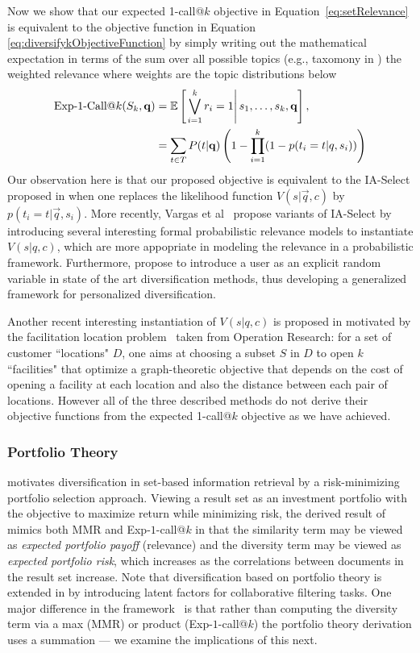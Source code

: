 Now we show that our expected 1-call@$k$ objective in Equation~\eqref{eq:setRelevance} is equivalent to the objective function in Equation \eqref{eq:diversifykObjectiveFunction} by simply writing out the mathematical expectation in terms of the sum over all possible topics (e.g., taxomony in \cite{agrawal09diversifying}) the weighted relevance where weights are the topic distributions below
\begin{align*}
    \ExpOneCall(S_k,\vec{q}) & = \mathbb{E} \left[\left. \bigvee_{i=1}^{k}r_i=1 \right| s_{1},\dots, s_{k},\vec{q} \right], \\
    												 & = \sum_{t\in T} P(t|\vec{q}) \left( 1 - \prod_{i=1}^{k}(1-p(t_i = t| q, s_i))\right) 
\end{align*}
Our observation here is that our proposed objective is equivalent to the IA-Select proposed in \cite{agrawal09diversifying} when one replaces the likelihood function $V(s|\vec{q}, c)$ by $p(t_i = t| \vec{q}, s_i)$. More recently, Vargas et al~\cite{Vargas:SIGIR2012} propose variants of IA-Select by introducing several interesting formal probabilistic relevance models to instantiate $V(s| q, c)$, which are more appopriate in modeling the relevance in a probabilistic framework. Furthermore, \cite{Vallet:SIGIR2012} propose to introduce a user as an explicit random variable in state of the art diversification methods, thus developing a generalized framework for personalized diversification.

Another recent interesting instantiation of $V(s|q,c)$ is proposed in \cite{Zuccon:ECIR2012} motivated by the facilitation location problem~\cite{Gonzalez:Handbook2007} taken from Operation Research: for a set of customer ``locations" $D$, one aims at choosing a subset $S$ in $D$ to open $k$ ``facilities" that optimize a graph-theoretic objective that depends on the cost of opening a facility at each location and also the distance between each pair of locations. However all of the three described methods do not derive their objective functions from the expected 1-call@$k$ objective as we have achieved. 

\subsubsection{Portfolio Theory}
\cite{wang09PortfolioTheory} motivates
diversification in set-based information retrieval by a
risk-minimizing portfolio selection approach.  Viewing a result set as
an investment portfolio with the objective to maximize return while
minimizing risk, the derived result of~\cite{wang09PortfolioTheory}
mimics both MMR and Exp-$1$-call@$k$ in that the similarity term may
be viewed as \emph{expected portfolio payoff} (relevance) and the
diversity term may be viewed as \emph{expected portfolio risk}, which
increases as the correlations between documents in the result set
increase. Note that diversification based on portfolio theory is extended in \cite{Shi:SIGIR2012} by introducing latent factors for collaborative filtering tasks. One major difference in the framework~\cite{wang09PortfolioTheory} is that rather than
computing the diversity term via a max (MMR) or product
(Exp-$1$-call@$k$) the portfolio theory derivation uses a summation
--- we examine the implications of this next.

